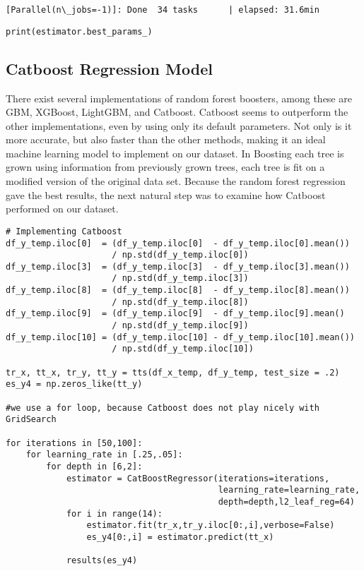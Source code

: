 \documentclass{article}
\begin{document}
\begin{Verbatim}[commandchars=\\\{\}]
[Parallel(n\_jobs=-1)]: Done  34 tasks      | elapsed: 31.6min

\end{Verbatim}

\begin{lstlisting}
print(estimator.best_params_)
\end{lstlisting}



\hypertarget{catboost-regression-model}{%
	\subsection{Catboost Regression Model}\label{catboost-regression-model}}

There exist
several implementations of random forest boosters, among these are GBM,
XGBoost, LightGBM, and Catboost. Catboost seems to outperform the other
implementations, even by using only its default parameters. Not only is
it more accurate, but also faster than the other methods, making it an
ideal machine learning model to implement on our dataset. In Boosting
each tree is grown using information from previously grown trees, each
tree is fit on a modified version of the original data set. Because the
random forest regression gave the best results, the next natural step
was to examine how Catboost performed on our dataset.

\begin{lstlisting}
# Implementing Catboost
df_y_temp.iloc[0]  = (df_y_temp.iloc[0]  - df_y_temp.iloc[0].mean())
                     / np.std(df_y_temp.iloc[0])
df_y_temp.iloc[3]  = (df_y_temp.iloc[3]  - df_y_temp.iloc[3].mean())
                     / np.std(df_y_temp.iloc[3])
df_y_temp.iloc[8]  = (df_y_temp.iloc[8]  - df_y_temp.iloc[8].mean())
                     / np.std(df_y_temp.iloc[8])
df_y_temp.iloc[9]  = (df_y_temp.iloc[9]  - df_y_temp.iloc[9].mean()
                     / np.std(df_y_temp.iloc[9])
df_y_temp.iloc[10] = (df_y_temp.iloc[10] - df_y_temp.iloc[10].mean())
                     / np.std(df_y_temp.iloc[10])

tr_x, tt_x, tr_y, tt_y = tts(df_x_temp, df_y_temp, test_size = .2)
es_y4 = np.zeros_like(tt_y)

#we use a for loop, because Catboost does not play nicely with GridSearch

for iterations in [50,100]:
	for learning_rate in [.25,.05]:
		for depth in [6,2]:
			estimator = CatBoostRegressor(iterations=iterations, 
										  learning_rate=learning_rate, 
										  depth=depth,l2_leaf_reg=64) 
			for i in range(14):
				estimator.fit(tr_x,tr_y.iloc[0:,i],verbose=False)
				es_y4[0:,i] = estimator.predict(tt_x)

			results(es_y4)
\end{lstlisting}
\end{document}
